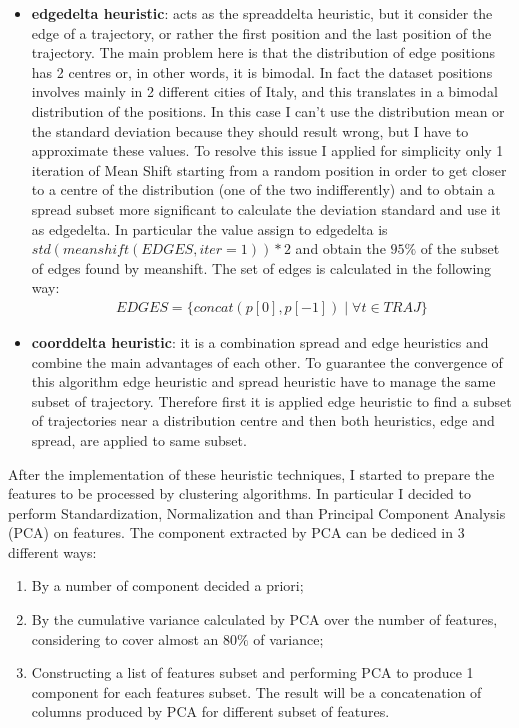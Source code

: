\begin{itemize}
	\item \textbf{edgedelta heuristic}: acts as the spreaddelta heuristic, but it consider the edge of a trajectory, or rather the first position and the last position of the trajectory. The main problem here is that the distribution of edge positions has 2 centres or, in other words, it is bimodal. In fact the dataset positions involves mainly in 2 different cities of Italy, and this translates in a bimodal distribution of the positions. In this case I can't use the distribution mean or the standard deviation because they should result wrong, but I have to approximate these values. To resolve this issue I applied for simplicity only 1 iteration of Mean Shift starting from a random position in order to get closer to a centre of the distribution (one of the two indifferently) and to obtain a spread subset more significant to calculate the deviation standard and use it as edgedelta. In particular the value assign to edgedelta is $std(meanshift(EDGES, iter=1)) * 2$ and obtain the $95\%$ of the subset of edges found by meanshift. The set of edges is calculated in the following way: 
	\begin{align}
		EDGES = \{concat(p[0], p[-1]) \mid \forall t \in TRAJ \}
	\end{align}
 	\item \textbf{coorddelta heuristic}: it is a combination spread and edge heuristics and combine the main advantages of each other. To guarantee the convergence of this algorithm edge heuristic and spread heuristic have to manage the same subset of trajectory. Therefore first it is applied edge heuristic to find a subset of trajectories near a distribution centre and then both heuristics, edge and spread, are applied to same subset.
\end{itemize}

After the implementation of these heuristic techniques, I started to prepare the features to be processed by clustering algorithms. In particular I decided to perform Standardization, Normalization and than Principal Component Analysis (PCA) on features. The component extracted by PCA can be dediced in 3 different ways:
\begin{enumerate}
	\item By a number of component decided a priori;
	\item By the cumulative variance calculated by PCA over the number of features, considering to cover almost an $80\%$ of variance;
	\item Constructing a list of features subset and performing PCA to produce 1 component for each features subset. The result will be a concatenation of columns produced by PCA for different subset of features.
\end{enumerate}


